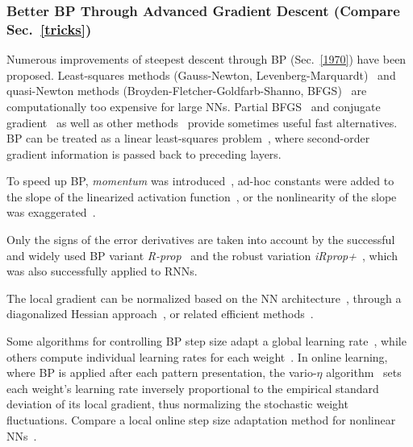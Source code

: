 \documentclass[letterpaper]{article}
\begin{document}
\begin{sloppypar}


\subsubsection{Better BP Through Advanced Gradient Descent (Compare Sec.~\ref{tricks})}
\label{betterbp}

Numerous improvements of steepest descent through BP (Sec.~\ref{1970}) have been proposed.
Least-squares methods (Gauss-Newton, Levenberg-Marquardt)~\citep{gauss1809,newton1687,levenberg1944,marquardt1963,schaback1992}
and quasi-Newton methods (Broyden-Fletcher-Goldfarb-Shanno, 
BFGS)~\citep{broyden1965,fletcher1963,goldfarb1970,shanno1970}
are computationally too expensive for large NNs.
Partial BFGS~\citep{Battiti:92,Saito:1997} and
conjugate gradient~\citep{HestenesStiefel:1952,Moller:93} 
as well as other methods~\citep{Solla:88,Schmidhuber:89-1,Cauwenberghs:93}
provide sometimes useful fast alternatives.
BP can be treated 
as a linear least-squares problem~\citep{Biegler:93}, where
second-order gradient information is passed back to preceding layers.

To speed up BP, {\em momentum} was introduced~\citep{Rumelhart:86},
ad-hoc constants were added to the slope of the linearized activation
function~\citep{Fahlman:88}, or the
nonlinearity of the slope was exaggerated~\citep{westsaad:96}.

Only the signs of the error derivatives are taken into account by the successful 
and widely used BP variant {\em R-prop}~\citep{rprop93}
and the robust variation {\em iRprop+}~\citep{igel:01},
which was also successfully applied to RNNs.

The local gradient can be normalized based 
on the NN architecture~\citep{Schraudolph:96}, 
through a diagonalized Hessian approach~\citep{Becker:89},
or related efficient methods~\citep{schraudolph02}.


Some algorithms for controlling BP step size
adapt a global learning rate~\citep{Lapedes:86a,Vogl:88,Battiti:89,lecun-simard-pearlmutter-93,Yu:1995},
while others compute individual learning rates for each
weight~\citep{Jacobs:88,SilvaAlmeida:1990}.
In online learning, where BP is applied after each pattern presentation,
the vario-$\eta$ algorithm~\citep{DBLP:conf/nips/NeuneierZ96} sets each weight's learning rate inversely proportional to the empirical standard deviation of its
local gradient, thus normalizing the stochastic weight fluctuations.
Compare a local online step size adaptation method for nonlinear NNs~\citep{Almeida:97}.


\end{sloppypar}
\end{document}
